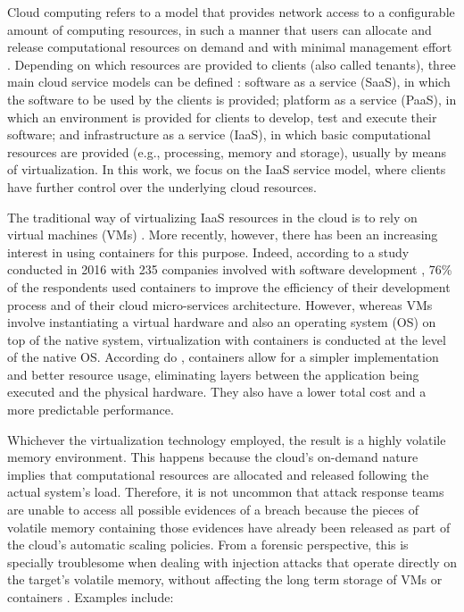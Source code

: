 \documentclass[conference]{IEEEtran}
\begin{document}
Cloud computing refers to a model that provides network access to a configurable amount of computing resources, in such a manner that users can allocate and release computational resources on demand and with minimal management effort \cite{NIST2011}.
%
Depending on which resources are provided to clients (also called tenants), three main cloud service models can be defined \cite{NIST2011}: software as a service (SaaS), in which the software to be used by the clients is provided; platform as a service (PaaS), in which an environment is provided for clients to develop, test and execute their software; and infrastructure as a service (IaaS), in which basic computational resources are provided (e.g., processing, memory and storage), usually by means of virtualization.
%
In this work, we focus on the IaaS service model, where clients have further control over the underlying cloud resources.


The traditional way of virtualizing IaaS resources in the cloud is to rely on virtual machines (VMs) \cite{Diamanti:2018}.
%
More recently, however, there has been an increasing interest in using containers for this purpose.
%
Indeed, according to a study conducted in 2016 with 235 companies involved with software development \cite{container-survey:2016}, 76\% of the respondents used containers to improve the efficiency of their development process and of their cloud micro-services architecture.
%
However, whereas VMs involve instantiating a virtual hardware and also an operating system (OS) on top of the native system, virtualization with containers is conducted at the level of the native OS.
%
According do \cite{Diamanti:2018}, containers allow for a simpler implementation and better resource usage, eliminating layers between the application being executed and the physical hardware.
%
They also have a lower total cost and a more predictable performance.


Whichever the virtualization technology employed, the result is a highly volatile memory environment.
%
This happens because the cloud's on-demand nature implies that computational resources are allocated and released following the actual system's load.
%
Therefore, it is not uncommon that attack response teams are unable to access all possible evidences of a breach because the pieces of volatile memory containing those evidences have already been released as part of the cloud's automatic scaling policies.
%
From a forensic perspective, this is specially troublesome when dealing with injection attacks that operate directly on the target's volatile memory, without affecting the long term storage of VMs or containers \cite{Case_Memory_Forensics:2014}. 
%
Examples include:
\end{document}
